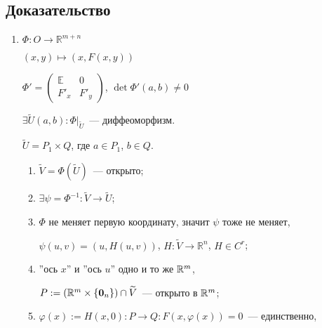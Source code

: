 \documentclass{article}
\begin{document}
        \subsection{Доказательство}
        
            \begin{enumerate}
            
                \item $\Phi : O \rightarrow \mathbb{R}^{m + n}$
                
                    $(x, y) \mapsto \left( x, F(x, y) \right)$
                    
                    $\Phi' = \begin{pmatrix} \mathbb{E} & \mathrm{0} \\ F'_x & F'_y \end{pmatrix}$, $\det \Phi'(a, b) \neq 0$
                    
                    $\exists \widetilde{U}(a, b) : \Phi \big|_{\widetilde{U}}$~--- диффеоморфизм.
                    
                    $\widetilde{U} = P_1 \times Q$, где $a \in P_1$, $b \in Q$.
                    
                    \begin{enumerate}
                    
                        \item $\widetilde{V} = \Phi \left( \widetilde{U} \right)$~--- открыто;
                        
                        \item $\exists \psi = \Phi^{-1} : \widetilde{V} \rightarrow \widetilde{U}$;
                        
                        \item $\Phi$ не меняет первую координату, значит $\psi$ тоже не меняет,
                        
                            $\psi(u, v) = (u, H(u, v) )$, $H : \widetilde{V} \rightarrow \mathbb{R}^n$, $H \in C^r$;
                            
                        \item ''ось $x$'' и ''ось $u$'' одно и то же $\mathbb{R}^m$,
                        
                            $P := \left( \mathbb{R}^m \times \left\{ \mathbf{0}_n \right\} \right) \cap \widetilde{V}$~--- открыто в $\mathbb{R}^m$;
                            
                        \item $\varphi (x) := H(x, 0) : P \rightarrow Q : F(x, \varphi(x) ) = 0$~--- единственно,
                        

\end{enumerate}
\end{enumerate}
\end{document}
